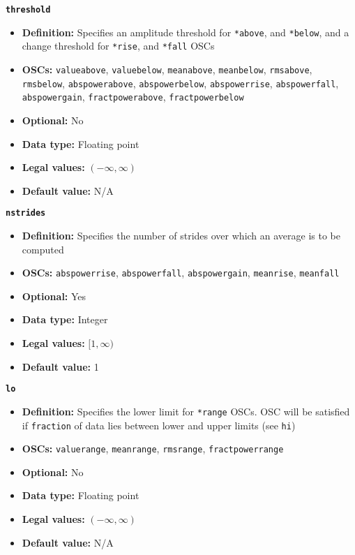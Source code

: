 \documentclass[11pt]{article}
\begin{document}
{\large\texttt{\textbf{threshold}}}
\begin{itemize}
\item \textbf{Definition:} Specifies an amplitude threshold for
  \texttt{*above}, and \texttt{*below}, and a change threshold for
  \texttt{*rise}, and \texttt{*fall} OSCs
\item \textbf{OSCs:} \texttt{valueabove}, \texttt{valuebelow},
  \texttt{meanabove}, \texttt{meanbelow}, \texttt{rmsabove}, 
  \texttt{rmsbelow}, \texttt{abspowerabove}, \texttt{abspowerbelow}, 
  \texttt{abspowerrise}, \texttt{abspowerfall},
  \texttt{abspowergain},  
  \texttt{fractpowerabove}, \texttt{fractpowerbelow}
\item \textbf{Optional:} No
\item \textbf{Data type:} Floating point
\item \textbf{Legal values:} $(-\infty, \infty)$
\item \textbf{Default value:} N/A
\end{itemize}

{\large\texttt{\textbf{nstrides}}}
\begin{itemize}
\item \textbf{Definition:} Specifies the number of strides over which
  an average is to be computed
\item \textbf{OSCs:} \texttt{abspowerrise},
  \texttt{abspowerfall}, \texttt{abspowergain}, \texttt{meanrise},
  \texttt{meanfall}
\item \textbf{Optional:} Yes
\item \textbf{Data type:} Integer
\item \textbf{Legal values:} $[1, \infty)$
\item \textbf{Default value:} 1
\end{itemize}

{\large\texttt{\textbf{lo}}}
\begin{itemize}
\item \textbf{Definition:} Specifies the lower limit for \texttt{*range}
  OSCs.  OSC will be satisfied if \texttt{fraction} of data lies between
  lower and upper limits (see \texttt{hi})
\item \textbf{OSCs:} \texttt{valuerange}, \texttt{meanrange},
  \texttt{rmsrange}, \texttt{fractpowerrange}
\item \textbf{Optional:} No
\item \textbf{Data type:} Floating point
\item \textbf{Legal values:} $(-\infty, \infty)$
\item \textbf{Default value:} N/A
\end{itemize}
\end{document}
